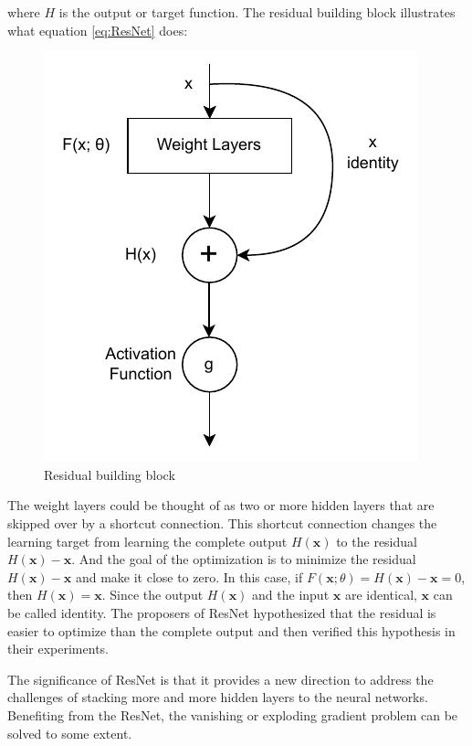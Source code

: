 \documentclass[
	parskip, 			   %
	twoside, 			   %
	DIV=14, 			   %
	BCOR=15.0mm, 		   %
	headsepline, 		   %
	open=right, 		   %
	captions=tableheading, %
	bibliography=totoc,    %
	numbers=noenddot       %
]{scrreprt}
\begin{document}
where $H$ is the output or target function. The residual building block illustrates what equation \ref{eq:ResNet} does:

\clearpage
\begin{figure}[htbp!]
    \centering
    \includegraphics[scale=1]{figures/ResNet.pdf}
    \caption{Residual building block}
    \label{fig:ResNet}
\end{figure}

The weight layers could be thought of as two or more hidden layers that are skipped over by a shortcut connection. This shortcut connection changes the learning target from learning the complete output $H(\mathbf{x})$ to the residual $H(\mathbf{x})-\mathbf{x}$. And the goal of the optimization is to minimize the residual $H(\mathbf{x})-\mathbf{x}$ and make it close to zero. In this case, if $F(\mathbf{x};\theta)=H(\mathbf{x})-\mathbf{x}=0$, then $H(\mathbf{x})=\mathbf{x}$. Since the output $H(\mathbf{x})$ and the input $\mathbf{x}$ are identical, $\mathbf{x}$ can be called identity. The proposers of ResNet hypothesized that the residual is easier to optimize than the complete output and then verified this hypothesis in their experiments. 

 The significance of ResNet is that it provides a new direction to address the challenges of stacking more and more hidden layers to the neural networks. Benefiting from the ResNet, the vanishing or exploding gradient problem can be solved to some extent.
\end{document}
